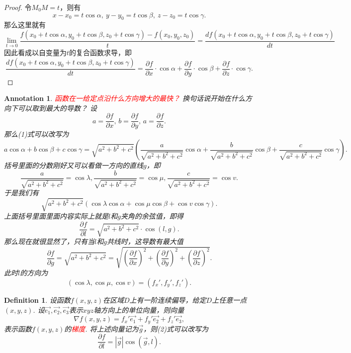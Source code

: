 \documentclass{article}
\newtheorem{definition}[theorem]{Definition}
\newtheorem{annotation}[theorem]{Annotation}
\newcommand{\redt}[1]{\textcolor{red}{#1}}
\begin{document}
\begin{proof}
\rm 令$M_0M=t$，则有
$$
x-x_0 = t\cos \alpha, ~y-y_0 = t\cos \beta , ~z-z_0 = t\cos\gamma.
$$
那么这里就有
$$
\lim\limits_{t \to 0} \frac{f(x_0+t\cos\alpha,y_0+t\cos\beta, z_0 + t\cos\gamma)-f(x_0,y_0,z_0)}{t} = \frac{df(x_0+t\cos\alpha,y_0+t\cos\beta, z_0 + t\cos\gamma)}{dt}
$$
因此看成以自变量为$t$的复合函数求导，即
$$
\frac{df(x_0+t\cos\alpha,y_0+t\cos\beta, z_0 + t\cos\gamma)}{dt} = \frac{\partial f}{\partial x}\cdot\cos \alpha + \frac{\partial f}{\partial y}\cdot\cos \beta + \frac{\partial f}{\partial z}\cdot\cos \gamma. 
$$
\end{proof}

\begin{annotation}
\rm \redt{函数在一给定点沿什么方向增大的最快？} 换句话说开始在什么方向下可以取到最大的导数？ 设
$$
a = \frac{\partial f}{\partial x},\,b = \frac{\partial f}{\partial y},\,a = \frac{\partial f}{\partial z}.
$$ 
那么(1)式可以改写为
$$
a\cos\alpha + b\cos\beta + c\cos\gamma  = \sqrt{a^2+b^2+c^2}\left(\frac{a}{\sqrt{a^2+b^2+c^2}}\cos\alpha + \frac{b}{\sqrt{a^2+b^2+c^2}}\cos\beta + \frac{c}{\sqrt{a^2+b^2+c^2}}\cos\gamma \right). 
$$
括号里面的分数刚好又可以看做一方向的直线$g$，即
$$
\frac{a}{\sqrt{a^2+b^2+c^2}} = \cos \lambda, \frac{b}{\sqrt{a^2+b^2+c^2}} = \cos \mu,
\frac{c}{\sqrt{a^2+b^2+c^2}} = \cos v.
$$
于是我们有
$$
\sqrt{a^2+b^2+c^2}(\cos\lambda\cos\alpha+\cos\mu\cos\beta+\cos v\cos\gamma).
$$
上面括号里面里面内容实际上就是$l$和$g$夹角的余弦值，即得
\begin{equation}
\frac{\partial f}{\partial l} = \sqrt{a^2+b^2+c^2}\cdot \cos(l,g).
\end{equation}
那么现在就很显然了，只有当$l$和$g$共线时，这导数有最大值
$$
\frac{\partial f}{\partial g} = \sqrt{a^2+b^2+c^2} = \sqrt{\left(\frac{\partial f}{\partial x}\right)^2 +\left(\frac{\partial f}{\partial y}\right)^2  + \left(\frac{\partial f}{\partial z}\right)^2 }.
$$
此时$l$的方向为
$$
(\cos \lambda, \cos \mu,\cos v) = (f_x', f_y', f_z'). 
$$
\end{annotation}

\begin{definition}
\rm 设函数$f(x,y,z)$在区域$D$上有一阶连续偏导，给定$D$上任意一点$(x,y,z)$. 设$\vec{e_1},\vec{e_2},\vec{e_3}$表示$xyz$轴方向上的单位向量，则向量
$$
\nabla f(x,y,z) =  f_x'\vec{e_1} + f_y' \vec{e_2} +f_z'\vec{e_3},
$$
表示函数$f(x,y,z)$的\redt{梯度}. 将上述向量记为$\vec{g}$，则(2)式可以改写为
$$
\frac{\partial f}{\partial l} = |\vec{g}|\cos(\vec{g},l).
$$
\end{definition}
\end{document}
